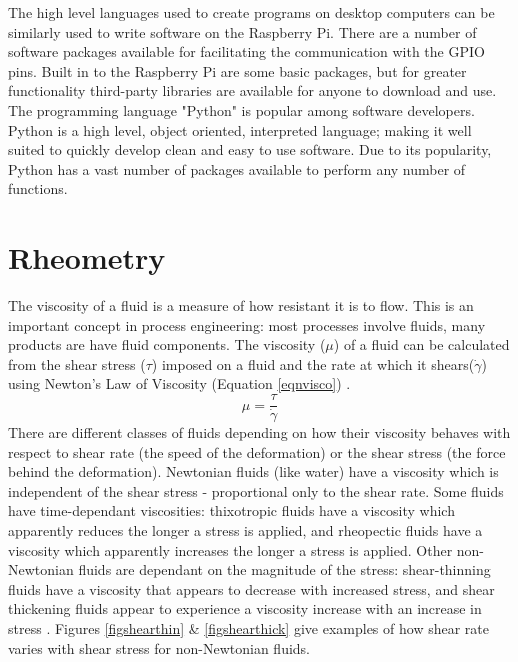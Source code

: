 \documentclass[twoside,a4]{report}
\def\br{\newline \newline \noindent}
\begin{document}
	The high level languages used to create programs on desktop computers can be similarly used to write software on the Raspberry Pi. There are a number of software packages available for facilitating the communication with the GPIO pins. Built in to the Raspberry Pi are some basic packages, but for greater functionality third-party libraries are available for anyone to download and use\cite{pilibswiringpi, pilibspigpio}. The programming language "Python" is popular among software developers. Python is a high level, object oriented, interpreted language; making it well suited to quickly develop clean and easy to use software. Due to its popularity, Python has a vast number of packages available to perform any number of functions.
	
	\section{Rheometry} %
	The viscosity of a fluid is a measure of how resistant it is to flow. This is an important concept in process engineering: most processes involve fluids, many products are have fluid components. The viscosity (\(\mu\)) of a fluid can be calculated from the shear stress (\(\tau\)) imposed on a fluid and the rate at which it shears(\(\dot{\gamma}\)) using Newton's Law of Viscosity (Equation \ref{eqnvisco}) \cite{backfluidmech}.
	\begin{equation}
	\mu = \frac{\tau}{\dot{\gamma}}
	\label{eqnvisco}
	\end{equation}
	There are different classes of fluids depending on how their viscosity behaves with respect to shear rate (the speed of the deformation) or the shear stress (the force behind the deformation). Newtonian fluids (like water) have a viscosity which is independent of the shear stress - proportional only to the shear rate. Some fluids have time-dependant viscosities: thixotropic fluids have a viscosity which apparently reduces the longer a stress is applied, and rheopectic fluids have a viscosity which apparently increases the longer a stress is applied. Other non-Newtonian fluids are dependant on the magnitude of the stress: shear-thinning fluids have a viscosity that appears to decrease with increased stress, and shear thickening fluids appear to experience a viscosity increase with an increase in stress \cite{backtypesofnonnewt}. Figures \ref{figshearthin} \& \ref{figshearthick} give examples of how shear rate varies with shear stress for non-Newtonian fluids. \br
\end{document}
